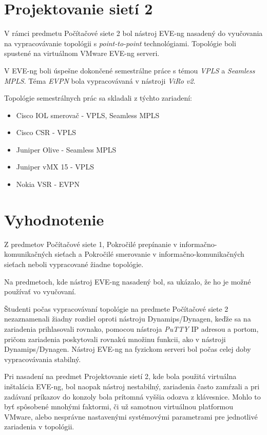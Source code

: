 \section{Projektovanie sietí 2}

V rámci predmetu Počítačové siete 2 bol nástroj EVE-ng nasadený do vyučovania na vypracovávanie topológii s \emph{point-to-point} technológiami. Topológie boli spustené na virtuálnom VMware EVE-ng serveri.

V EVE-ng boli úspešne dokončené semestrálne práce s témou \emph{VPLS} a \emph{Seamless MPLS}. Téma \emph{EVPN} bola vypracovávaná v nástroji \emph{ViRo v2}.

Topológie semestrálnych prác sa skladali z týchto zariadení:

\begin{itemize}[noitemsep]
    \item Cisco IOL smerovač - VPLS, Seamless MPLS
    \item Cisco CSR - VPLS
    \item Juniper Olive - Seamless MPLS
    \item Juniper vMX 15 - VPLS
    \item Nokia VSR - EVPN
\end{itemize}





\section{Vyhodnotenie}

Z predmetov Počítačové siete 1, Pokročilé prepínanie v informačno-komunikačných sieťach a Pokročilé smerovanie v informačno-komunikačných sieťach neboli vypracované žiadne topológie.

Na predmetoch, kde nástroj EVE-ng nasadený bol, sa ukázalo, že ho je možné používať vo vyučovaní.

Študenti počas vypracovávaní topológie na predmete Počítačové siete 2 nezaznamenali žiadny rozdiel oproti nástroju Dynamips/Dynagen, keďže sa na zariadenia prihlasovali rovnako, pomocou nástroja \emph{PuTTY} IP adresou a portom, pričom zariadenia poskytovali rovnakú množinu funkcii, ako v nástroji Dynamips/Dynagen. Nástroj EVE-ng na fyzickom serveri bol počas celej doby vypracovávania stabilný.

Pri nasadení na predmet Projektovanie sietí 2, kde bola použitá virtuálna inštalácia EVE-ng, bol naopak nástroj nestabilný, zariadenia často zamŕzali a pri zadávaní príkazov do konzoly bola prítomná vyššia odozva z klávesnice. Mohlo to byť spôsobené mnohými faktormi, či už samotnou virtuálnou platformou VMware, alebo nesprávne nastavenými systémovými parametrami pre jednotlivé zariadenia v topológii.

